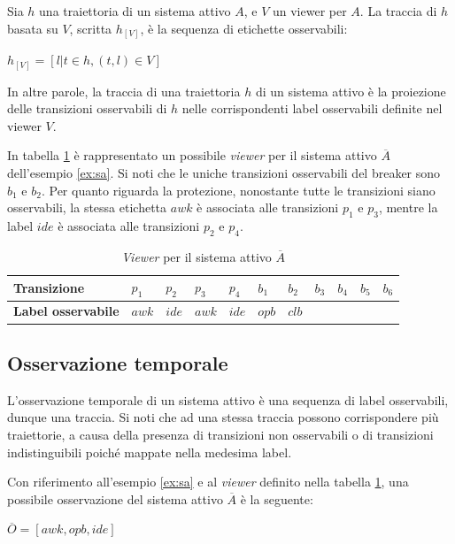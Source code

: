 \begin{defn}
Sia $h$ una traiettoria di un sistema attivo $A$, e $V$ un viewer per $A$. La traccia di $h$ basata su $V$, scritta $h_{[V]}$, è la sequenza di etichette osservabili:
\begin{center}
$h_{[V]} = [l|t \in h, (t,l) \in V]$
\end{center}
\end{defn}
In altre parole, la traccia di una traiettoria $h$ di un sistema attivo è la proiezione delle transizioni osservabili di $h$ nelle corrispondenti label osservabili definite nel viewer $V$.

\begin{ex}
In tabella \ref{tab:viewer} è rappresentato un possibile \emph{viewer} per il sistema attivo $\overline{A}$ dell'esempio \ref{ex:sa}. Si noti che le uniche transizioni osservabili del breaker sono $b_1$ e $b_2$. Per quanto riguarda la protezione, nonostante tutte le transizioni siano osservabili, la stessa etichetta $awk$ è associata alle transizioni $p_1$ e $p_3$, mentre la label $ide$ è associata alle transizioni $p_2$ e $p_4$. 
\end{ex}

\begin{table}[htbp] 
\begin{tabularx}{\textwidth}{l X X X X X X X X X X}
\hline
\textbf{Transizione} & $p_1$ & $p_2$ & $p_3$ & $p_4$ & $b_1$ & $b_2$ & $b_3$ & $b_4$ & $b_5$ & $b_6$\\
\hline
\textbf{Label osservabile} & $awk$ & $ide$ & $awk$ & $ide$ & $opb$ & $clb$ &  &  &  & \\
\hline
\end{tabularx}
\caption{\emph{Viewer} per il sistema attivo $\overline{A}$}
\label{tab:viewer}
\end{table}

\subsection{Osservazione temporale}
L'osservazione temporale di un sistema attivo è una sequenza di label osservabili, dunque una traccia.
Si noti che ad una stessa traccia possono corrispondere più traiettorie, a causa della presenza di transizioni non osservabili o di transizioni indistinguibili poiché mappate nella medesima label.

\begin{ex} \label{ex:oss}
Con riferimento all'esempio \ref{ex:sa} e al \emph{viewer} definito nella tabella \ref{tab:viewer}, una possibile osservazione del sistema attivo $\overline{A}$ è la seguente:
\begin{center}
$\overline{O} = [ awk, opb, ide] $
\end{center}
\end{ex}


